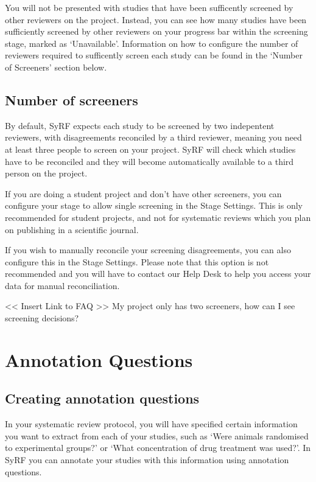 \documentclass[
]{book}
\begin{document}
You will not be presented with studies that have been sufficently screened by other reviewers on the project. Instead, you can see how many studies have been sufficiently screened by other reviewers on your progress bar within the screening stage, marked as `Unavailable'. Information on how to configure the number of reviewers required to sufficently screen each study can be found in the `Number of Screeners' section below.

\hypertarget{number-of-screeners}{%
\section{Number of screeners}\label{number-of-screeners}}

By default, SyRF expects each study to be screened by two indepentent reviewers, with disagreements reconciled by a third reviewer, meaning you need at least three people to screen on your project. SyRF will check which studies have to be reconciled and they will become automatically available to a third person on the project.

If you are doing a student project and don't have other screeners, you can configure your stage to allow single screening in the Stage Settings. This is only recommended for student projects, and not for systematic reviews which you plan on publishing in a scientific journal.

If you wish to manually reconcile your screening disagreements, you can also configure this in the Stage Settings. Please note that this option is not recommended and you will have to contact our Help Desk to help you access your data for manual reconciliation.

\textless{}\textless{} Insert Link to FAQ \textgreater{}\textgreater{}
My project only has two screeners, how can I see screening decisions?

\hypertarget{annotation}{%
\chapter{Annotation Questions}\label{annotation}}

\hypertarget{creating-annotation-questions}{%
\section{Creating annotation questions}\label{creating-annotation-questions}}

In your systematic review protocol, you will have specified certain information you want to extract from each of your studies, such as `Were animals randomised to experimental groups?' or `What concentration of drug treatment was used?'. In SyRF you can annotate your studies with this information using annotation questions.
\end{document}
